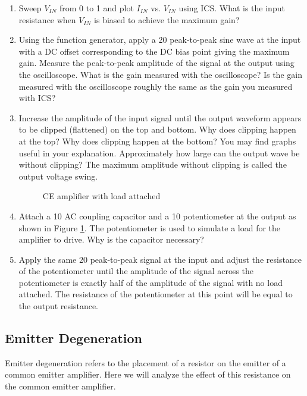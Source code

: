 \documentclass{article}
\begin{document}
\begin{enumerate}
\item Sweep $V_{IN}$ from \unit{0}{\volt} to \unit{1}{\volt} and plot $I_{IN}$ vs. $V_{IN}$ using ICS. What is the input resistance when $V_{IN}$ is biased to achieve the maximum gain?
\item Using the function generator, apply a \unit{20}{\milli\volt} peak-to-peak sine wave at the input with a DC offset corresponding to the DC bias point giving the maximum gain. Measure the peak-to-peak amplitude of the signal at the output using the oscilloscope. What is the gain measured with the oscilloscope? Is the gain measured with the oscilloscope roughly the same as the gain you measured with ICS?
\item Increase the amplitude of the input signal until the output waveform appears to be clipped (flattened) on the top and bottom. Why does clipping happen at the top? Why does clipping happen at the bottom? You may find graphs useful in your explanation. Approximately how large can the output wave be without clipping? The maximum amplitude without clipping is called the output voltage swing.

	\begin{figure}[!htb]
		
		\centerline{\box\graph}
		\caption{CE amplifier with load attached}
		\label{CEwithload}
	\end{figure}

\item Attach a \unit{10}{\micro\farad} AC coupling capacitor and a \unit{10}{\kilo\ohm} potentiometer at the output as shown in Figure \ref{CEwithload}. The potentiometer is used to simulate a load for the amplifier to drive. Why is the capacitor necessary? 
\item Apply the same \unit{20}{\milli\volt} peak-to-peak signal at the input and adjust the resistance of the potentiometer until the amplitude of the signal across the potentiometer is exactly half of the amplitude of the signal with no load attached. The resistance of the potentiometer at this point will be equal to the output resistance.

\end{enumerate}

\subsection{Emitter Degeneration}
Emitter degeneration refers to the placement of a resistor on the emitter of a common emitter amplifier. Here we will analyze the effect of this resistance on the common emitter amplifier. 
\end{document}
